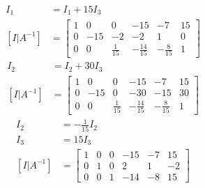 \documentclass{article}
\begin{document}
\begin{align*}
	I_1 & = I_1 + 15I_3 \\
	[I|A^{-1}] & =
		\left[ \begin{array}{ccc|ccc}
			1 & 0 & 0 & -15 & -7 & 15 \\
			0 & -15 & -2 & -2 & 1 & 0 \\
			0 & 0 & \frac{1}{15} & -\frac{14}{15} & -\frac{8}{15} & 1
		\end{array} \right]
\end{align*}
\begin{align*}
	I_2 & = I_2 + 30I_3 \\
	[I|A^{-1}] & =
		\left[ \begin{array}{ccc|ccc}
			1 & 0 & 0 & -15 & -7 & 15 \\
			0 & -15 & 0 & -30 & -15 & 30 \\
			0 & 0 & \frac{1}{15} & -\frac{14}{15} & -\frac{8}{15} & 1
		\end{array} \right]
\end{align*}
\begin{align*}
	I_2 & = -\frac{1}{15}I_2 \\
	I_3 & = 15I_3 \\
	[I|A^{-1}] & =
		\left[ \begin{array}{ccc|ccc}
			1 & 0 & 0 & -15 & -7 & 15 \\
			0 & 1 & 0 & 2 & 1 & -2 \\
			0 & 0 & 1 & -14 & -8 & 15
		\end{array} \right]
\end{align*}
\end{document}
